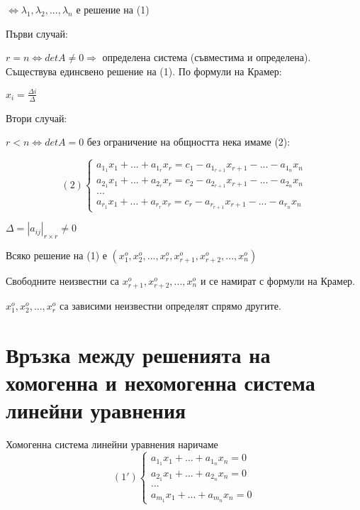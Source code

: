 \documentclass[fleqn,12pt]{article}
\begin{document}
\begin{flushleft}
    $ \Leftrightarrow \lambda_1, \lambda_2, ..., \lambda_n $ е решение на (1)

    \vspace{5mm}

    Първи случай: 

    $ r = n \Leftrightarrow detA \neq 0 \Rightarrow $ определена система (съвместима и определена). Съществува единсвено решение на (1). По формули на Крамер:

    $ x_i = \frac{\Delta i}{\Delta} $

    \vspace{5mm}

    Втори случай:

    $ r < n \Leftrightarrow detA = 0 $ без ограничение на общността нека имаме (2):

    \begin{equation*}
        (2)\begin{cases}
            a_{1_1}x_1+...+a_{1_r}x_r = c_1 - a_{1_{r+1}}x_{r+1} - ... - a_{1_n}x_n\\
            a_{2_1}x_1+...+a_{2_r}x_r = c_2 - a_{2_{r+1}}x_{r+1} - ... - a_{2_n}x_n\\
            ...\\
            a_{r_1}x_1+...+a_{r_r}x_r = c_r - a_{r_{r+1}}x_{r+1} - ... - a_{r_n}x_n
        \end{cases}
    \end{equation*}

    $ \Delta = | a_{ij} |_{r \times r} \neq 0 $

    Всяко решение на (1) е $ ( x_1^o, x_2^o, ..., x_r^o, x_{r+1}^o, x_{r+2}^o, ..., x_n^o ) $

    Свободните неизвестни са $ x_{r+1}^o, x_{r+2}^o, ..., x_n^o $ и се намират с формули на Крамер.

    $ x_1^o, x_2^o, ..., x_r^o $ са зависими неизвестни определят спрямо другите.


\section{Връзка между решенията на хомогенна и нехомогенна система линейни уравнения}
Хомогенна система линейни уравнения наричаме
\begin{equation*}
    (1')\begin{cases}
        a_{1_1}x_1+...+a_{1_n}x_n = 0\\
        a_{2_1}x_1+...+a_{2_n}x_n = 0\\
        ...\\
        a_{m_1}x_1+...+a_{m_n}x_n = 0
    \end{cases}
\end{equation*}


\end{flushleft}
\end{document}
